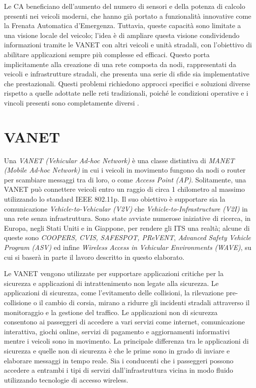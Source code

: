 Le CA beneficiano dell'aumento del numero di sensori e della potenza di calcolo presenti nei veicoli moderni, che hanno già portato a funzionalità innovative come la Frenata Automatica d'Emergenza. Tuttavia, queste capacità sono limitate a una visione locale del veicolo; l'idea è di ampliare questa visione condividendo informazioni tramite le VANET con altri veicoli e unità stradali, con l'obiettivo di abilitare applicazioni sempre più complesse ed efficaci. 
Questo porta implicitamente alla creazione di una rete composta da nodi, rappresentati da veicoli e infrastrutture stradali, che presenta una serie di sfide sia implementative che prestazionali. Questi problemi richiedono approcci specifici e soluzioni diverse rispetto a quelle adottate nelle reti tradizionali, poiché le condizioni operative e i vincoli presenti sono completamente diversi \cite{risma2021implementation}.

\section{VANET}
Una \textit{VANET (Vehicular Ad-hoc Network)} è una classe distintiva di \textit{MANET (Mobile Ad-hoc Network)} in cui i veicoli in movimento fungono da nodi o router per scambiare messaggi tra di loro, o come \textit{Access Point (AP)}. Solitamente, una VANET può connettere veicoli entro un raggio di circa 1 chilometro al massimo utilizzando lo standard IEEE 802.11p. Il suo obiettivo è supportare sia la comunicazione \textit{Vehicle-to-Vehicular (V2V)} che \textit{Vehicle-to-Infrastructure (V2I)} in una rete senza infrastruttura. Sono state avviate numerose iniziative di ricerca, in Europa, negli Stati Uniti e in Giappone, per rendere gli ITS una realtà; alcune di queste sono \textit{COOPERS, CVIS, SAFESPOT, PReVENT}, \textit{Advanced Safety Vehicle Program (ASV)} ed infine \textit{Wireless Access in Vehicular Environments (WAVE)}, su cui si baserà in parte il lavoro descritto in questo elaborato.

Le VANET vengono utilizzate per supportare applicazioni critiche per la sicurezza e applicazioni di intrattenimento non legate alla sicurezza. Le applicazioni di sicurezza, come l'evitamento delle collisioni, la rilevazione pre-collisione o il cambio di corsia, mirano a ridurre gli incidenti stradali attraverso il monitoraggio e la gestione del traffico. Le applicazioni non di sicurezza consentono ai passeggeri di accedere a vari servizi come internet, comunicazione interattiva, giochi online, servizi di pagamento e aggiornamenti informativi mentre i veicoli sono in movimento. La principale differenza tra le applicazioni di sicurezza e quelle non di sicurezza è che le prime sono in grado di inviare e elaborare messaggi in tempo reale. Sia i conducenti che i passeggeri possono accedere a entrambi i tipi di servizi dall'infrastruttura vicina in modo fluido utilizzando tecnologie di accesso wireless.

